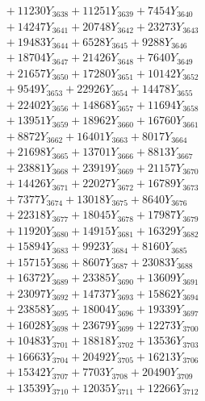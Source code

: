 \documentclass[a4paper,10pt]{article}
\begin{document}
{\begin{align}
&\;  + 11230 Y_{3638} + 11251 Y_{3639} + 7454 Y_{3640} \\[0.3ex]
&\;  + 14247 Y_{3641} + 20748 Y_{3642} + 23273 Y_{3643} \\[0.3ex]
&\;  + 19483 Y_{3644} + 6528 Y_{3645} + 9288 Y_{3646} \\[0.3ex]
&\;  + 18704 Y_{3647} + 21426 Y_{3648} + 7640 Y_{3649} \\[0.3ex]
&\;  + 21657 Y_{3650} + 17280 Y_{3651} + 10142 Y_{3652} \\[0.3ex]
&\;  + 9549 Y_{3653} + 22926 Y_{3654} + 14478 Y_{3655} \\[0.3ex]
&\;  + 22402 Y_{3656} + 14868 Y_{3657} + 11694 Y_{3658} \\[0.5ex]\allowbreak
&\;  + 13951 Y_{3659} + 18962 Y_{3660} + 16760 Y_{3661} \\[0.3ex]
&\;  + 8872 Y_{3662} + 16401 Y_{3663} + 8017 Y_{3664} \\[0.3ex]
&\;  + 21698 Y_{3665} + 13701 Y_{3666} + 8813 Y_{3667} \\[0.3ex]
&\;  + 23881 Y_{3668} + 23919 Y_{3669} + 21157 Y_{3670} \\[0.3ex]
&\;  + 14426 Y_{3671} + 22027 Y_{3672} + 16789 Y_{3673} \\[0.3ex]
&\;  + 7377 Y_{3674} + 13018 Y_{3675} + 8640 Y_{3676} \\[0.3ex]
&\;  + 22318 Y_{3677} + 18045 Y_{3678} + 17987 Y_{3679} \\[0.3ex]
&\;  + 11920 Y_{3680} + 14915 Y_{3681} + 16329 Y_{3682} \\[0.3ex]
&\;  + 15894 Y_{3683} + 9923 Y_{3684} + 8160 Y_{3685} \\[0.3ex]
&\;  + 15715 Y_{3686} + 8607 Y_{3687} + 23083 Y_{3688} \\[0.5ex]\allowbreak
&\;  + 16372 Y_{3689} + 23385 Y_{3690} + 13609 Y_{3691} \\[0.3ex]
&\;  + 23097 Y_{3692} + 14737 Y_{3693} + 15862 Y_{3694} \\[0.3ex]
&\;  + 23858 Y_{3695} + 18004 Y_{3696} + 19339 Y_{3697} \\[0.3ex]
&\;  + 16028 Y_{3698} + 23679 Y_{3699} + 12273 Y_{3700} \\[0.3ex]
&\;  + 10483 Y_{3701} + 18818 Y_{3702} + 13536 Y_{3703} \\[0.3ex]
&\;  + 16663 Y_{3704} + 20492 Y_{3705} + 16213 Y_{3706} \\[0.3ex]
&\;  + 15342 Y_{3707} + 7703 Y_{3708} + 20490 Y_{3709} \\[0.3ex]
&\;  + 13539 Y_{3710} + 12035 Y_{3711} + 12266 Y_{3712} \\[0.3ex]

\end{align}}
\end{document}

